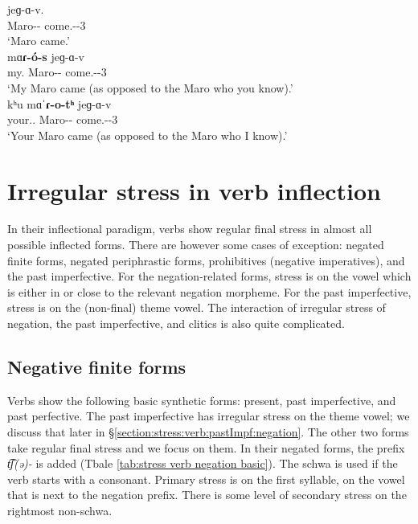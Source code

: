 \begin{exe}
	\ex\label{ex:stress:prestress:hypo sentce: add more}
	\begin{xlist}
		\ex {} {jeɡ-ɑ-v}.\\
		Maro-{\hcr}-{} come.{\aorperf}-{\pst}-3{\sg}\\
		\trans `Maro came.'
		\\ 
		\ex {} {mɑ\textbf{ɾ-\'o-s}}    {jeɡ-ɑ-v} \\
		my.{\gen} Maro-{\hcr}-{\possFsg}    come.{\aorperf}-{\pst}-3{\sg}\\
		\trans `My Maro came (as opposed to the Maro who you know).'
		\\ 
		\ex \gll   kʰu mɑˈ\textbf{ɾ-o-tʰ}  {jeɡ-ɑ-v} \\
		your.{\gen}.{\sg}   Maro-{\hcr}-{\possSsg} come.{\aorperf}-{\pst}-3{\sg}\\
		\trans `Your Maro came (as opposed to the Maro who I know).'
		\\ 
	\end{xlist}
\end{exe}




\section{Irregular stress in verb inflection}\label{section:stress:verb}
In their inflectional paradigm, verbs show regular final stress in almost all possible inflected forms. There are however some cases of exception: negated finite forms, negated periphrastic forms, prohibitives (negative imperatives), and the past imperfective. For the negation-related forms, stress is on the vowel which is either in or close to the relevant negation morpheme.  For the past imperfective,    stress is on the (non-final) theme vowel. The interaction of irregular stress of negation, the past imperfective, and clitics is also quite complicated. 


\subsection{Negative finite forms}\label{section:stress:verb:negFinite}
Verbs show the following basic synthetic forms: present, past imperfective, and past perfective. The past imperfective has irregular stress on the theme vowel; we discuss that later in \S\ref{section:stress:verb:pastImpf:negation}. The other two forms take regular final stress and we focus on them. In their negated forms, the prefix \textit{t͡ʃ(ə)-} is added (Tbale \ref{tab:stress verb negation basic}). The schwa is used if the verb starts with a consonant. Primary stress is on the first syllable, on the vowel that is next to the negation prefix. There is some level of secondary stress on the rightmost non-schwa. 

